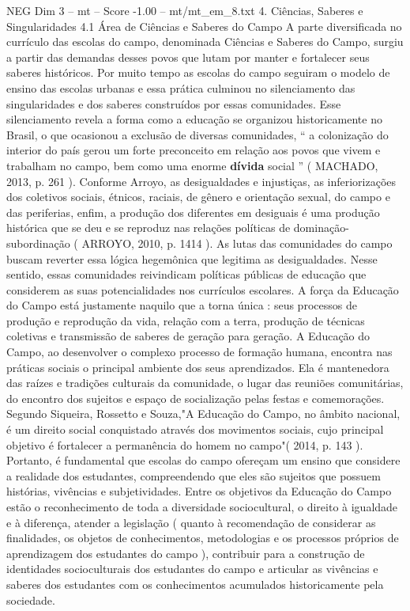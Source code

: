 \begin{textsample}{NEG Dim 3 – mt – Score -1.00 – mt/mt\_em\_8.txt}  \label{ex:f3_neg_211}
4.
Ciências, Saberes e Singularidades 4.1 Área de Ciências e Saberes do Campo A parte diversificada no currículo das escolas do campo, denominada Ciências e Saberes do Campo, surgiu a partir das demandas desses povos que lutam por manter e fortalecer seus saberes históricos.
Por muito tempo as escolas do campo seguiram o modelo de ensino das escolas urbanas e essa prática culminou no silenciamento das singularidades e dos saberes construídos por essas comunidades.
Esse silenciamento revela a forma como a educação se organizou historicamente no Brasil, o que ocasionou a exclusão de diversas comunidades, “ a colonização do interior do país gerou um forte preconceito em relação aos povos que vivem e trabalham no campo, bem como uma enorme \textbf{dívida} social ” ( MACHADO, 2013, p. 261 ).
Conforme Arroyo, as desigualdades e injustiças, as inferiorizações dos coletivos sociais, étnicos, raciais, de gênero e orientação sexual, do campo e das periferias, enfim, a produção dos diferentes em desiguais é uma produção histórica que se deu e se reproduz nas relações políticas de dominação-subordinação ( ARROYO, 2010, p. 1414 ).
As lutas das comunidades do campo buscam reverter essa lógica hegemônica que legitima as desigualdades.
Nesse sentido, essas comunidades reivindicam políticas públicas de educação que considerem as suas potencialidades nos currículos escolares.
A força da Educação do Campo está justamente naquilo que a torna única : seus processos de produção e reprodução da vida, relação com a terra, produção de técnicas coletivas e transmissão de saberes de geração para geração.
A Educação do Campo, ao desenvolver o complexo processo de formação humana, encontra nas práticas sociais o principal ambiente dos seus aprendizados.
Ela é mantenedora das raízes e tradições culturais da comunidade, o lugar das reuniões comunitárias, do encontro dos sujeitos e espaço de socialização pelas festas e comemorações.
Segundo Siqueira, Rossetto e Souza,"A Educação do Campo, no âmbito nacional, é um direito social conquistado através dos movimentos sociais, cujo principal objetivo é fortalecer a permanência do homem no campo"( 2014, p. 143 ).
Portanto, é fundamental que escolas do campo ofereçam um ensino que considere a realidade dos estudantes, compreendendo que eles são sujeitos que possuem histórias, vivências e subjetividades.
Entre os objetivos da Educação do Campo estão o reconhecimento de toda a diversidade sociocultural, o direito à igualdade e à diferença, atender a legislação ( quanto à recomendação de considerar as finalidades, os objetos de conhecimentos, metodologias e os processos próprios de aprendizagem dos estudantes do campo ), contribuir para a construção de identidades socioculturais dos estudantes do campo e articular as vivências e saberes dos estudantes com os conhecimentos acumulados historicamente pela sociedade.

\end{textsample}
